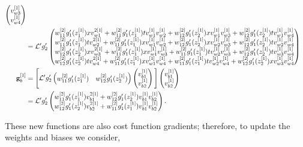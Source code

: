 \documentclass{article}
\begin{document}
\begin{align}
\begin{pmatrix}
v_{w3}^{[1]} \\
v_{w4}^{[1]}
\end{pmatrix} \nonumber \\
&= 
\mathcal{L}'
g_2'
\begin{pmatrix}
w_{11}^{[2]}  g_1'(z_1^{[1]}) x v_{w1}^{2[1]} + w_{11}^{[2]} g_1'(z_1^{[1]}) t v_{w1}^{[1]}v_{w2}^{[1]} + w_{12}^{[2]} g_1'(z_2^{[1]}) x v_{w1}^{[1]}v_{w3}^{[1]} +  w_{12}^{[2]} g_1'(z_2^{[1]}) t v_{w1}^{[1]}v_{w4}^{[1]}\\
w_{11}^{[2]} g_1'(z_1^{[1]}) t v_{w2}^{2[1]} + w_{11}^{[2]}  g_1'(z_1^{[1]}) x v_{w1}^{[1]}v_{w2}^{[1]} + w_{12}^{[2]} g_1'(z_2^{[1]}) x v_{w2}^{[1]}v_{w3}^{[1]} +  w_{12}^{[2]} g_1'(z_2^{[1]}) t v_{w2}^{[1]}v_{w4}^{[1]}\\
w_{12}^{[2]} g_1'(z_2^{[1]}) x v_{w3}^{2[1]} + w_{11}^{[2]}  g_1'(z_1^{[1]}) x v_{w1}^{[1]}v_{w3}^{[1]} + w_{11}^{[2]} g_1'(z_1^{[1]}) t v_{w2}^{[1]}v_{w3}^{[1]}  +  w_{12}^{[2]} g_1'(z_2^{[1]}) t v_{w3}^{[1]}v_{w4}^{[1]}\\
w_{12}^{[2]} g_1'(z_2^{[1]}) t v_{w4}^{2[1]} +
w_{11}^{[2]}  g_1'(z_1^{[1]}) x v_{w1}^{[1]}v_{w4}^{[1]} + w_{11}^{[2]} g_1'(z_1^{[1]}) t v_{w2}^{[1]}v_{w4}^{[1]} + w_{12}^{[2]} g_1'(z_2^{[1]}) x v_{w3}^{[1]}v_{w4}^{[1]}
\end{pmatrix}
\label{dJdw1mat_fw3}
\\ 
\textbf{g}_b^{[1]} &= 
\Bigg{[}\mathcal{L}'
g_2'
\begin{pmatrix}
w_{11}^{[2]} g_1'(z_1^{[1]}) & w_{12}^{[2]} g_1'(z_2^{[1]}) 
\end{pmatrix}
\begin{pmatrix}
v_{b1}^{[1]}\\ v_{b2}^{[1]}
\end{pmatrix}\Bigg{]}
\begin{pmatrix}
v_{b1}^{[1]}\\ v_{b2}^{[1]}
\end{pmatrix} \nonumber \\
&= 
\mathcal{L}'
g_2'
\begin{pmatrix}
w_{11}^{[2]} g_1'(z_1^{[1]}) v_{b1}^{2[1]} + w_{12}^{[2]} g_1'(z_2^{[1]}) v_{b1}^{[1]}v_{b2}^{[1]} 
\\ 
w_{12}^{[2]} g_1'(z_2^{[1]}) v_{b2}^{2[1]}  + w_{11}^{[2]} g_1'(z_1^{[1]}) v_{b1}^{[1]} v_{b2}^{[1]}
\end{pmatrix}.
\label{dJdb1mat_fw3}
\end{align}

These new functions are also cost function gradients; therefore, to update the weights and biases we consider,
\end{document}
